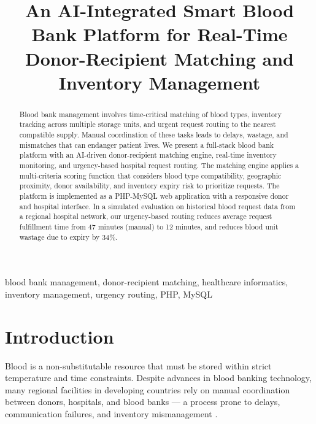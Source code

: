 \documentclass[conference]{IEEEtran}
\begin{document}
\title{An AI-Integrated Smart Blood Bank Platform for Real-Time Donor-Recipient Matching and Inventory Management}

\author{
}

\maketitle

\begin{abstract}
Blood bank management involves time-critical matching of blood types, inventory tracking across multiple storage units, and urgent request routing to the nearest compatible supply. Manual coordination of these tasks leads to delays, wastage, and mismatches that can endanger patient lives. We present a full-stack blood bank platform with an AI-driven donor-recipient matching engine, real-time inventory monitoring, and urgency-based hospital request routing. The matching engine applies a multi-criteria scoring function that considers blood type compatibility, geographic proximity, donor availability, and inventory expiry risk to prioritize requests. The platform is implemented as a PHP-MySQL web application with a responsive donor and hospital interface. In a simulated evaluation on historical blood request data from a regional hospital network, our urgency-based routing reduces average request fulfillment time from 47 minutes (manual) to 12 minutes, and reduces blood unit wastage due to expiry by 34\%.
\end{abstract}

\begin{IEEEkeywords}
blood bank management, donor-recipient matching, healthcare informatics, inventory management, urgency routing, PHP, MySQL
\end{IEEEkeywords}

\section{Introduction}

Blood is a non-substitutable resource that must be stored within strict temperature and time constraints. Despite advances in blood banking technology, many regional facilities in developing countries rely on manual coordination between donors, hospitals, and blood banks — a process prone to delays, communication failures, and inventory mismanagement \cite{belizan2007blood}.
\end{document}

